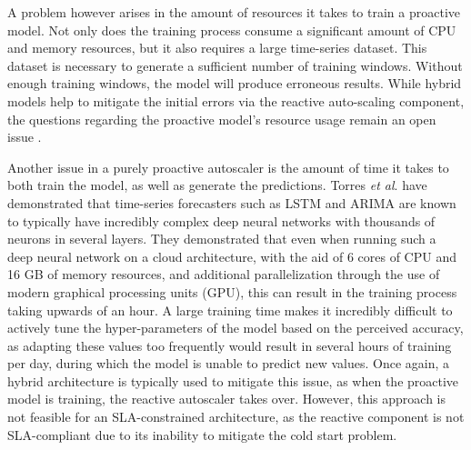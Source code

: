 A problem however arises in the amount of resources it takes to train a proactive model. Not only does the training process consume a significant amount of CPU and memory resources, but it also requires a large time-series dataset. This dataset is necessary to generate a sufficient number of training windows. Without enough training windows, the model will produce erroneous results. While hybrid models help to mitigate the initial errors via the reactive auto-scaling component, the questions regarding the proactive model's resource usage remain an open issue \cite{radhika2021review}.\par


Another issue in a purely proactive autoscaler is the amount of time it takes to both train the model, as well as generate the predictions. Torres \textit{et al}. \cite{torres2021deep} have demonstrated that time-series forecasters such as LSTM and ARIMA are known to typically have incredibly complex deep neural networks with thousands of neurons in several layers. They demonstrated that even when running such a deep neural network on a cloud architecture, with the aid of 6 cores of CPU and 16 GB of memory resources, and additional parallelization through the use of modern graphical processing units (GPU), this can result in the training process taking upwards of an hour. A large training time makes it incredibly difficult to actively tune the hyper-parameters of the model based on the perceived accuracy, as adapting these values too frequently would result in several hours of training per day, during which the model is unable to predict new values. Once again, a hybrid architecture is typically used to mitigate this issue, as when the proactive model is training, the reactive autoscaler takes over. However, this approach is not feasible for an SLA-constrained architecture, as the reactive component is not SLA-compliant due to its inability to mitigate the cold start problem.\par


